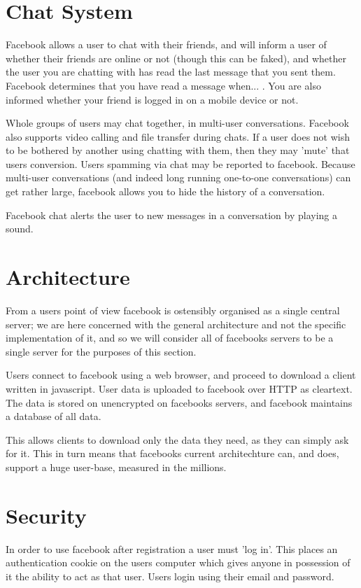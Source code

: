 \section{Chat System}
Facebook allows a user to chat with their friends, and will inform a user of
whether their friends are online or not (though this can be faked), and whether
the user you are chatting with has read the last message that you sent them.
Facebook determines that you have read a message when... . You are also informed whether your friend is logged in on a mobile
device or not.

Whole groups of users may chat together, in multi-user conversations. Facebook
also supports video calling and file transfer during chats. If a user does not
wish to be bothered by another using chatting with them, then they may 'mute'
that users conversion. Users spamming via chat may be reported to facebook.
Because multi-user conversations (and indeed long running one-to-one
conversations) can get rather large, facebook allows you to hide the history of
a conversation.

Facebook chat alerts the user to new messages in a conversation by playing a
sound.

\section{Architecture}
From a users point of view facebook is ostensibly organised as a single central
server; we are here concerned with the general architecture and not the
specific implementation of it, and so we will consider all of facebooks servers
to be a single server for the purposes of this section.

Users connect to facebook using a web browser, and proceed to download a client
written in javascript. User data is uploaded to facebook over HTTP as cleartext.
The data is stored on unencrypted on facebooks servers, and facebook maintains
a database of all data.

This allows clients to download only the data they need, as they can simply ask
for it. This in turn means that facebooks current architechture can, and does,
support a huge user-base, measured in the millions.


\section{Security}
In order to use facebook after registration a user must 'log in'. This places an
authentication cookie on the users computer which gives anyone in possession of
it the ability to act as that user. Users login using their email and password.

